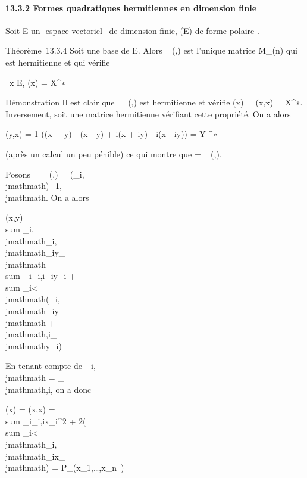 \documentclass[]{article}
\begin{document}
\paragraph{13.3.2 Formes quadratiques hermitiennes en dimension finie}

Soit E un -espace vectoriel ~de dimension finie, \Phi \inQ(E) de forme
polaire \phi.

Théorème~13.3.4 Soit  une base de E. Alors
\mathrmMat~ (\phi,) est
l'unique matrice \Omega \in M_(n) qui est hermitienne et qui vérifie

\forall~x \in E, \Phi(x) = X^∗~\OmegaX

Démonstration Il est clair que \Omega =\
\mathrmMat (\Phi,) est hermitienne et vérifie \Phi(x) =
\phi(x,x) = X^∗\OmegaX. Inversement, soit \Omega une matrice hermitienne
vérifiant cette propriété. On a alors

\phi(y,x) = 1  (\Phi(x + y) - \Phi(x - y) + i\Phi(x + iy)
- i\Phi(x - iy)) = Y ^∗\OmegaX

(après un calcul un peu pénible) ce qui montre que \Omega
= \mathrmMat~ (\phi,).

Posons \Omega = \mathrmMat~ (\phi,)
= (\omega_i,\\jmathmath)_1\leqi,\\jmathmath\leqn. On a alors

\phi(x,y) = \\sum
_i,\\jmathmath\omega_i,\\jmathmath\overlinex_iy_\\jmathmath
= \\sum
_i\omega_i,i\overlinex_iy_i
+ \\sum
_i\textless{}\\jmathmath(\omega_i,\\jmathmath\overlinex_iy_\\jmathmath
+ \omega_\\jmathmath,i\overlinex_\\jmathmathy_i)

En tenant compte de \omega_i,\\jmathmath =
\overline\omega_\\jmathmath,i, on a donc

\Phi(x) = \phi(x,x) = \\sum
_i\omega_i,ix_i^2 +
2\mathrmRe(\\sum
_i\textless{}\\jmathmath\omega_i,\\jmathmath\overlinex_ix_\\jmathmath)
=
P_\Phi(x_1,\ldots,x_n~)
\end{document}
